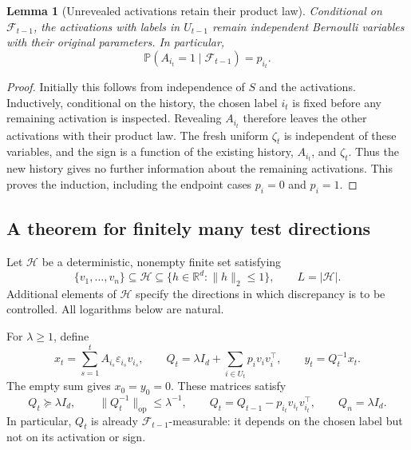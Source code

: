 \documentclass[11pt,a4paper]{article}
\numberwithin{equation}{section}
\newtheorem{lemma}[theorem]{Lemma}
\theoremstyle{remark}
\newcommand{\R}{\mathbb R}
\newcommand{\Pp}{\mathbb P}
\newcommand{\F}{\mathcal F}
\newcommand{\HH}{\mathcal H}
\DeclareMathOperator{\op}{op}
\begin{document}
\begin{lemma}[Unrevealed activations retain their product law]
\label{lem:product}
Conditional on $\F_{t-1}$, the activations with labels in $U_{t-1}$
remain independent Bernoulli variables with their original parameters.
In particular,
\begin{equation}\label{eq:conditional-activation}
 \Pp(A_{i_t}=1\mid\F_{t-1})=p_{i_t}.
\end{equation}
\end{lemma}
\begin{proof}
Initially this follows from independence of $S$ and the activations.
Inductively, conditional on the history, the chosen label $i_t$ is fixed
before any remaining activation is inspected. Revealing $A_{i_t}$
therefore leaves the other activations with their product law. The fresh
uniform $\zeta_t$ is independent of these variables, and the sign is a
function of the existing history, $A_{i_t}$, and $\zeta_t$. Thus the new
history gives no further information about the remaining activations.
This proves the induction, including the endpoint cases $p_i=0$ and
$p_i=1$.
\end{proof}

\subsection{A theorem for finitely many test directions}

Let $\HH$ be a deterministic, nonempty finite set satisfying
\begin{equation}\label{eq:test-set}
 \{v_1,\ldots,v_n\}\subseteq\HH\subseteq
 \{h\in\R^d:\|h\|_2\le1\},\qquad L=|\HH|.
\end{equation}
Additional elements of $\HH$ specify the directions in which discrepancy
is to be controlled. All logarithms below are natural.

For $\lambda\ge1$, define
\begin{equation}\label{eq:states}
 x_t=\sum_{s=1}^t A_{i_s}\varepsilon_{i_s}v_{i_s},\qquad
 Q_t=\lambda I_d+\sum_{i\in U_t}p_i v_iv_i^\top,\qquad
 y_t=Q_t^{-1}x_t.
\end{equation}
The empty sum gives $x_0=y_0=0$. These matrices satisfy
\begin{equation}\label{eq:matrix-basic}
 Q_t\succeq\lambda I_d,\qquad
 \|Q_t^{-1}\|_{\op}\le\lambda^{-1},\qquad
 Q_t=Q_{t-1}-p_{i_t}v_{i_t}v_{i_t}^\top,\qquad
 Q_n=\lambda I_d.
\end{equation}
In particular, $Q_t$ is already $\F_{t-1}$-measurable: it depends on the
chosen label but not on its activation or sign.
\end{document}
